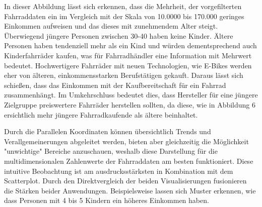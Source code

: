 \documentclass[usegeometry=true]{scrartcl}
\begin{document}
\newline In dieser Abbildung lässt sich erkennen, dass die Mehrheit, der vorgefilterten Fahrraddaten ein im Vergleich mit der Skala von 10.0000 bis 170.000 geringes Einkommen aufweisen und das dieses mit zunehmendem Alter steigt. Überwiegend jüngere Personen zwischen 30-40 haben keine Kinder. Ältere Personen haben tendenziell mehr als ein Kind und würden dementsprechend auch Kinderfahrräder kaufen, was für Fahrradhändler eine Information mit Mehrwert bedeutet. Hochwertigere Fahrräder mit neuen Technologien, wie E-Bikes werden eher von älteren, einkommensstarken Berufstätigen gekauft. Daraus lässt sich schießen, dass das Einkommen mit der Kaufbereitschaft für ein Fahrrad zusammenhängt. Im Umkehrschluss bedeutet dies, dass Hersteller für eine jüngere Zielgruppe preiswertere Fahrräder herstellen sollten, da diese, wie in Abbildung 6 ersichtlich mehr jüngere Fahrradkaufende als ältere beinhaltet.  

Durch die Parallelen Koordinaten können übersichtlich Trends und Verallgemeinerungen abgeleitet werden, bieten aber gleichzeitig die Möglichkeit "unwichtige" Bereiche anzuschauen, weshalb diese Darstellung für die multidimensionalen Zahlenwerte der Fahrraddaten am besten funktioniert. Diese intuitive Beobachtung ist am ausdrucksstärksten in Kombination mit dem Scatterplot. Durch den Direktvergleich der beiden Visualisierungen fusionieren die Stärken beider Anwendungen. Beispielsweise lassen sich Muster erkennen, wie dass Personen mit 4 bis 5 Kindern ein höheres Einkommen haben.
\end{document}
